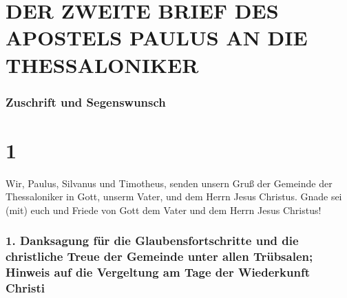 \hypertarget{der-zweite-brief-des-apostels-paulus-an-die-thessaloniker}{%
\section{DER ZWEITE BRIEF DES APOSTELS PAULUS AN DIE
THESSALONIKER}\label{der-zweite-brief-des-apostels-paulus-an-die-thessaloniker}}

\hypertarget{zuschrift-und-segenswunsch}{%
\subsubsection{Zuschrift und
Segenswunsch}\label{zuschrift-und-segenswunsch}}

\hypertarget{section}{%
\section{1}\label{section}}

 Wir, Paulus, Silvanus und Timotheus, senden unsern Gruß
der Gemeinde der Thessaloniker in Gott, unserm Vater, und dem Herrn
Jesus Christus.  Gnade sei (mit) euch und Friede von Gott
dem Vater und dem Herrn Jesus Christus!

\hypertarget{danksagung-fuxfcr-die-glaubensfortschritte-und-die-christliche-treue-der-gemeinde-unter-allen-truxfcbsalen-hinweis-auf-die-vergeltung-am-tage-der-wiederkunft-christi}{%
\subsubsection{1. Danksagung für die Glaubensfortschritte und die
christliche Treue der Gemeinde unter allen Trübsalen; Hinweis auf die
Vergeltung am Tage der Wiederkunft
Christi}\label{danksagung-fuxfcr-die-glaubensfortschritte-und-die-christliche-treue-der-gemeinde-unter-allen-truxfcbsalen-hinweis-auf-die-vergeltung-am-tage-der-wiederkunft-christi}}

